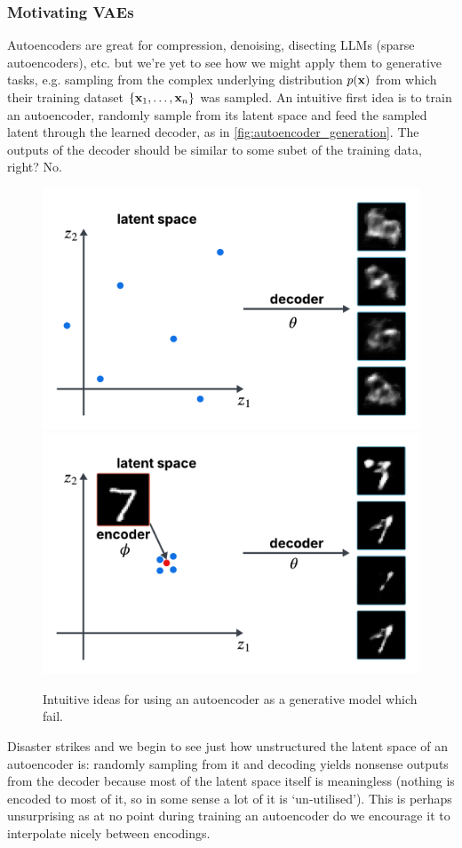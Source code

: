 \documentclass[11pt]{article}
\begin{document}
\subsubsection{Motivating VAEs}
Autoencoders are great for compression, denoising, disecting LLMs (sparse autoencoders), etc. but we're yet to see how we might apply them to generative tasks, e.g. sampling from the complex underlying distribution $p(\mathbf{x})$ from which their training dataset $\{\mathbf{x}_1,\dots,\mathbf{x}_n\}$ was sampled. An intuitive first idea is to train an autoencoder, randomly sample from its latent space and feed the sampled latent through the learned decoder, as in \autoref{fig:autoencoder_generation}. The outputs of the decoder should be similar to some subet of the training data, right? No.

\begin{figure}[t]
    \centering
    \includegraphics[width=0.49\columnwidth]{./figures/generative_models/AE_gen_1.pdf}
    \includegraphics[width=0.49\columnwidth]{./figures/generative_models/AE_gen_2.pdf}
    \caption{Intuitive ideas for using an autoencoder as a generative model which fail.}
    \label{fig:autoencoder_generation}
\end{figure}

Disaster strikes and we begin to see just how unstructured the latent space of an autoencoder is: randomly sampling from it and decoding yields nonsense outputs from the decoder because most of the latent space itself is meaningless (nothing is encoded to most of it, so in some sense a lot of it is `un-utilised'). This is perhaps unsurprising as at no point during training an autoencoder do we encourage it to interpolate nicely between encodings.
\end{document}
